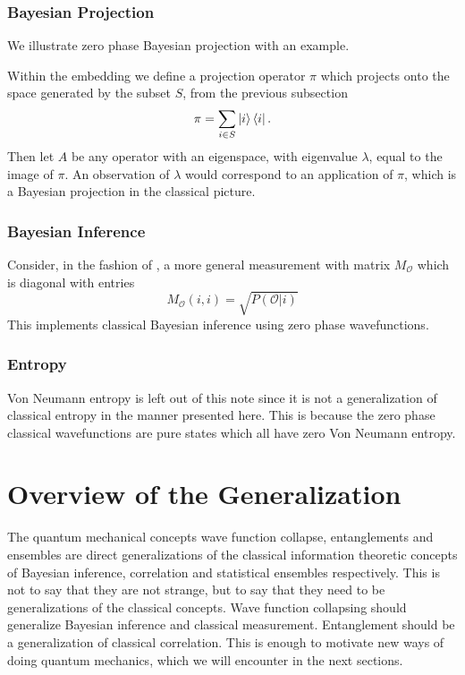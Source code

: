 \documentclass[12pt,a4paper]{article}
\theoremstyle{myrule}
\begin{document}
\subsubsection{Bayesian Projection}
We illustrate zero phase Bayesian projection with an example.

Within the embedding we define a projection operator $\pi$ which projects onto the space generated by the subset $S$, from the previous subsection
\[
\pi = \sum_{i \in S} \ket{i} \bra{i}.
\]
Then let $A$ be any operator with an eigenspace, with eigenvalue $\lambda$, equal to the image of $\pi$.  An observation of $\lambda$ would correspond to an application of $\pi$, which is a Bayesian projection in the classical picture.

\subsubsection{Bayesian Inference}
Consider, in the fashion of \cite{nielsenchuang}, a more general measurement with matrix $M_\mathcal{O}$ which is diagonal with entries
\[
   M_\mathcal{O}(i,i) = \sqrt{P(\mathcal{O} | i)}
\]
This implements classical Bayesian inference using zero phase wavefunctions.


\subsubsection{Entropy}
Von Neumann entropy is left out of this note since it is not a generalization of classical entropy in the manner presented here.  This is because the zero phase classical wavefunctions are pure states which all have zero Von Neumann entropy.

\section{Overview of the Generalization}

The quantum mechanical concepts wave function collapse, entanglements and ensembles are direct generalizations of the classical information theoretic concepts of Bayesian inference, correlation and statistical ensembles respectively.  This is not to say that they are not strange, but to say that they need to be generalizations of the classical concepts.  Wave function collapsing should generalize Bayesian inference and classical measurement.  Entanglement should be a generalization of classical correlation.  This is enough to motivate new ways of doing quantum mechanics, which we will encounter in the next sections.
\end{document}

